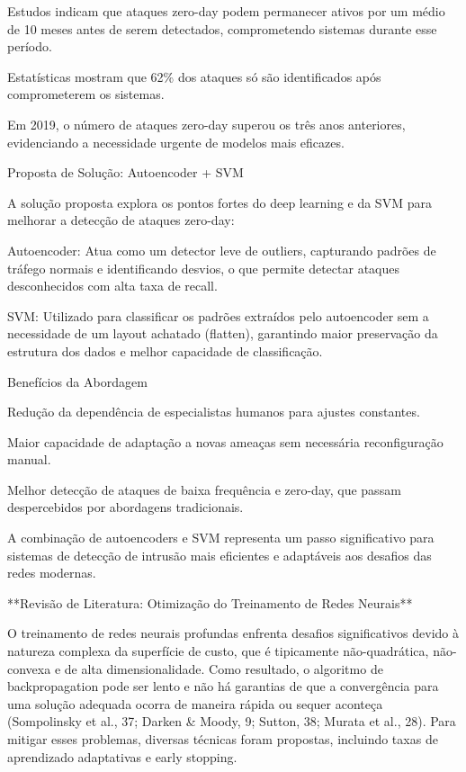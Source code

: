 \documentclass[conference]{IEEEtran}
\begin{document}
Estudos indicam que ataques zero-day podem permanecer ativos por um médio de 10 meses antes de serem detectados, comprometendo sistemas durante esse período.

Estatísticas mostram que 62\% dos ataques só são identificados após comprometerem os sistemas.

Em 2019, o número de ataques zero-day superou os três anos anteriores, evidenciando a necessidade urgente de modelos mais eficazes.

Proposta de Solução: Autoencoder + SVM

A solução proposta explora os pontos fortes do deep learning e da SVM para melhorar a detecção de ataques zero-day:

Autoencoder: Atua como um detector leve de outliers, capturando padrões de tráfego normais e identificando desvios, o que permite detectar ataques desconhecidos com alta taxa de recall.

SVM: Utilizado para classificar os padrões extraídos pelo autoencoder sem a necessidade de um layout achatado (flatten), garantindo maior preservação da estrutura dos dados e melhor capacidade de classificação.

Benefícios da Abordagem

Redução da dependência de especialistas humanos para ajustes constantes.

Maior capacidade de adaptação a novas ameaças sem necessária reconfiguração manual.

Melhor detecção de ataques de baixa frequência e zero-day, que passam despercebidos por abordagens tradicionais.

A combinação de autoencoders e SVM representa um passo significativo para sistemas de detecção de intrusão mais eficientes e adaptáveis aos desafios das redes modernas.

    \cite{5} **Revisão de Literatura: Otimização do Treinamento de Redes Neurais**

    O treinamento de redes neurais profundas enfrenta desafios significativos devido à natureza complexa da superfície de custo, que é tipicamente não-quadrática, não-convexa e de alta dimensionalidade. Como resultado, o algoritmo de backpropagation pode ser lento e não há garantias de que a convergência para uma solução adequada ocorra de maneira rápida ou sequer aconteça (Sompolinsky et al., 37; Darken & Moody, 9; Sutton, 38; Murata et al., 28). Para mitigar esses problemas, diversas técnicas foram propostas, incluindo taxas de aprendizado adaptativas e early stopping.
    
\end{document}
